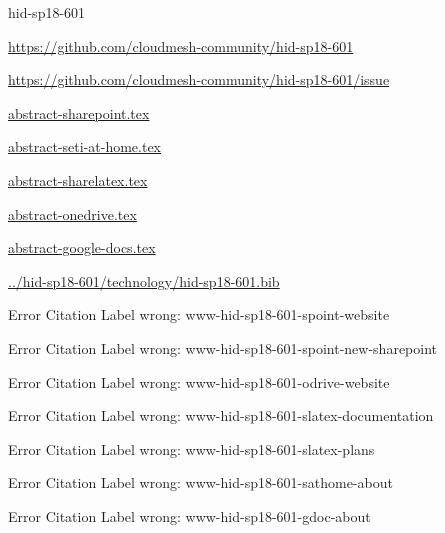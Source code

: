 \begin{IU}

hid-sp18-601

\url{https://github.com/cloudmesh-community/hid-sp18-601}

\url{https://github.com/cloudmesh-community/hid-sp18-601/issue}

\href{https://github.com/cloudmesh-community/hid-sp18-601/blob/master//technology/abstract-sharepoint.tex}{abstract-sharepoint.tex}

\href{https://github.com/cloudmesh-community/hid-sp18-601/blob/master//technology/abstract-seti-at-home.tex}{abstract-seti-at-home.tex}

\href{https://github.com/cloudmesh-community/hid-sp18-601/blob/master//technology/abstract-sharelatex.tex}{abstract-sharelatex.tex}

\href{https://github.com/cloudmesh-community/hid-sp18-601/blob/master//technology/abstract-onedrive.tex}{abstract-onedrive.tex}

\href{https://github.com/cloudmesh-community/hid-sp18-601/blob/master//technology/abstract-google-docs.tex}{abstract-google-docs.tex}

\href{https://github.com/cloudmesh-community/hid-sp18-601/blob/master//technology/hid-sp18-601.bib}{../hid-sp18-601/technology/hid-sp18-601.bib}

 Error Citation Label wrong: www-hid-sp18-601-spoint-website

 Error Citation Label wrong: www-hid-sp18-601-spoint-new-sharepoint

 Error Citation Label wrong: www-hid-sp18-601-odrive-website

 Error Citation Label wrong: www-hid-sp18-601-slatex-documentation

 Error Citation Label wrong: www-hid-sp18-601-slatex-plans

 Error Citation Label wrong: www-hid-sp18-601-sathome-about

 Error Citation Label wrong: www-hid-sp18-601-gdoc-about

\end{IU}


